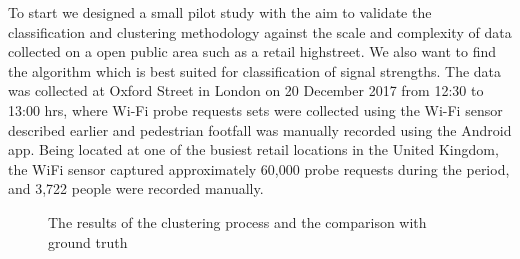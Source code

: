 To start we designed a small pilot study with the aim to validate the classification and clustering methodology against the scale and complexity of data collected on a open public area such as a retail highstreet.
We also want to find the algorithm which is best suited for classification of signal strengths.
The data was collected at Oxford Street in London on 20 December 2017 from 12:30 to 13:00 hrs, where Wi-Fi probe requests sets were collected using the Wi-Fi sensor described earlier and pedestrian footfall was manually recorded using the Android app.
Being located at one of the busiest retail locations in the United Kingdom, the WiFi sensor captured approximately 60,000 probe requests during the period, and 3,722 people were recorded manually.

\begin{figure}
	\centering
	\hspace{20pt}
	\caption{The results of the clustering process and the comparison with ground truth} \label{methodology_schematic}
\end{figure}

